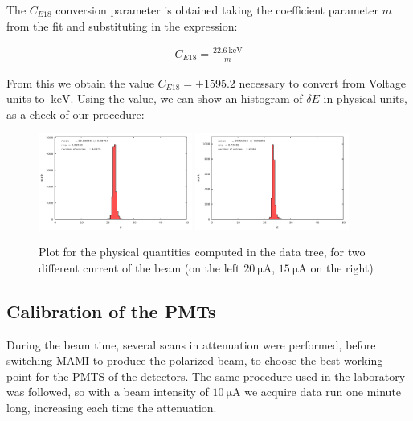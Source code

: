 The $C_{E18}$ conversion parameter is obtained taking the coefficient parameter $m$ from the fit and substituting in the expression:

\begin{align*}
C_{E18} =  \frac{\SI{22.6}{\kilo \electronvolt}}{m}
\end{align*}

From this we obtain the value $C_{E18} = +1595.2$ necessary to convert from Voltage units to $\SI{}{\kilo \electronvolt}$. Using the value, we can show an histogram of $\delta E$ in physical units, as a check of our procedure:

\begin{figure}[hbtp]
\centering
\includegraphics[width = 0.45\textwidth]{Analysis/ENMOCheck20.pdf}
\includegraphics[width = 0.45\textwidth]{Analysis/ENMOCheck15.pdf} 
\caption{Plot for the physical quantities computed in the data tree, for two different current of the beam (on the left $\SI{20}{\micro \ampere}$, $\SI{15}{\micro \ampere}$ on the right)}
\end{figure}
\newpage
\subsection{Calibration of the PMTs}


During the beam time, several scans in attenuation were performed, before switching MAMI to produce the polarized beam, to choose the best working point for the PMTS of the detectors. The same procedure used in the laboratory was followed, so with a beam intensity of $\SI{10}{\micro \ampere}$ we acquire data run one minute long, increasing each time the attenuation.

